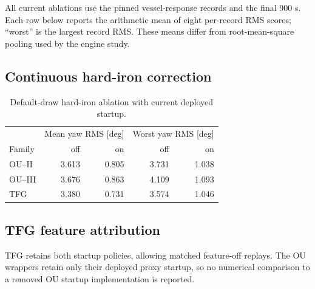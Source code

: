 All current ablations use the pinned vessel-response records and the
final 900 s. Each row below reports the arithmetic mean of eight per-record
RMS scores; ``worst'' is the largest record RMS. These means differ from
root-mean-square pooling used by the engine study.

\subsection{Continuous hard-iron correction}
\begin{table}[t]\centering
\caption{Default-draw hard-iron ablation with current deployed startup.}
\label{tab:startup-hardiron}\footnotesize
\begin{tabular}{@{}lrrrr@{}}\toprule
& \multicolumn{2}{c}{Mean yaw RMS [deg]} & \multicolumn{2}{c}{Worst yaw RMS [deg]} \\
Family & off & on & off & on \\
\midrule
OU--II & 3.613 & 0.805 & 3.731 & 1.038 \\
OU--III & 3.676 & 0.863 & 4.109 & 1.093 \\
TFG & 3.380 & 0.731 & 3.574 & 1.046 \\
\bottomrule\end{tabular}\end{table}

\subsection{TFG feature attribution}
TFG retains both startup policies, allowing matched feature-off replays.
The OU wrappers retain only their deployed proxy startup, so no numerical
comparison to a removed OU startup implementation is reported.
\begin{table}[t]\centering
\caption{TFG default-draw feature ablations. Bias is mean accelerometer-bias RMS.}
\label{tab:tfg-ablation}\footnotesize
{}\end{table}

